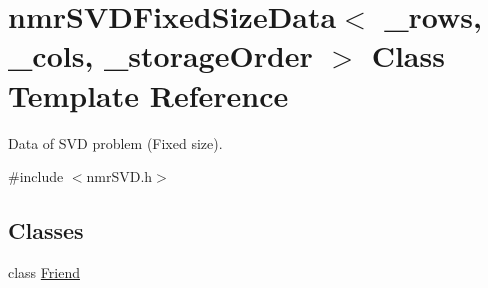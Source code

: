 \hypertarget{classnmr_s_v_d_fixed_size_data}{\section{nmr\-S\-V\-D\-Fixed\-Size\-Data$<$ \-\_\-rows, \-\_\-cols, \-\_\-storage\-Order $>$ Class Template Reference}
\label{classnmr_s_v_d_fixed_size_data}
}


Data of S\-V\-D problem (Fixed size).  




{\ttfamily \#include $<$nmr\-S\-V\-D.\-h$>$}

\subsection*{Classes}
\begin{DoxyCompactItemize}
\item 
class \hyperlink{classnmr_s_v_d_fixed_size_data_1_1_friend}{Friend}
\end{DoxyCompactItemize}
